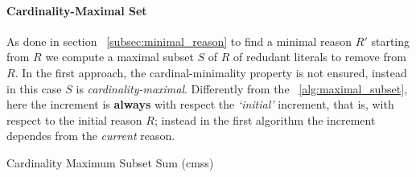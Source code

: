 \paragraph{Cardinality-Maximal Set}
As done in section ~\ref{subsec:minimal_reason} to find a minimal reason $R'$ starting 
from $R$ we compute a maximal subset $S$ of $R$ of redudant literals to remove from $R$.
In the first approach, the cardinal-minimality property is not ensured, instead 
in this case $S$ is \textit{cardinality-maximal}.
Differently from the ~\ref{alg:maximal_subset}, here the increment is \textbf{always}
with respect the \textit{`initial'} increment, that is, with respect to the initial reason $R$;
instead in the first algorithm the increment dependes from the \textit{current} reason.
  
\begin{algorithm}[H]\small
\caption{Cardinality Maximum Subset Sum (cmss)}
    \label{alg:cmss}
\end{algorithm}


